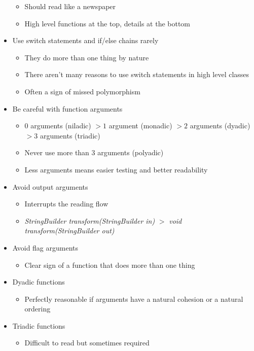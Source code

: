 \begin{itemize}
    \begin{itemize}
        \item Should read like a newspaper
        \item High level functions at the top, details at the bottom
    \end{itemize}
    \item Use switch statements and if/else chains rarely
    \begin{itemize}
        \item They do more than one thing by nature
        \item There aren't many reasons to use switch statements in high level classes
        \item Often a sign of missed polymorphism
    \end{itemize}
    \newpage
    \item Be careful with function arguments
    \begin{itemize}
        \item $0$ arguments (niladic) $>1$ argument (monadic) $>2$ arguments (dyadic) $>3$ arguments (triadic)
        \item Never use more than $3$ arguments (polyadic)
        \item Less arguments means easier testing and better readability
    \end{itemize}
    \item Avoid output arguments
    \begin{itemize}
        \item Interrupts the reading flow
        \item \textit{StringBuilder transform(StringBuilder in)} $>$ \textit{void transform(StringBuilder out)}
    \end{itemize}
    \item Avoid flag arguments
    \begin{itemize}
        \item Clear sign of a function that does more than one thing
    \end{itemize}
    \item Dyadic functions
    \begin{itemize}
        \item Perfectly reasonable if arguments have a natural cohesion or a natural ordering
    \end{itemize}
    \item Triadic functions
    \begin{itemize}
        \item Difficult to read but sometimes required

\end{itemize}
\end{itemize}

